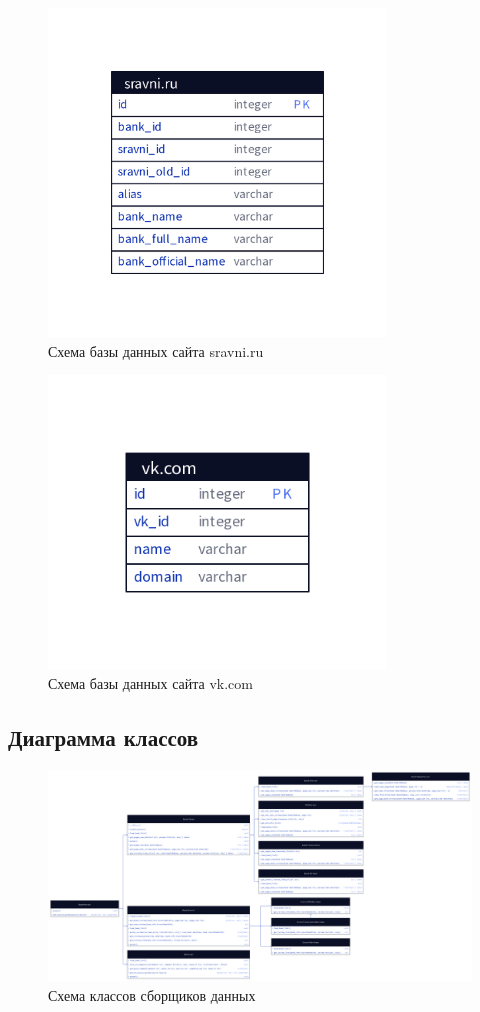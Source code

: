 \documentclass[PI, VKR]{HSEUniversity}
\begin{document}
\begin{figure}[h!]
\centering
\includegraphics[width=0.8\textwidth]{img/d2/sravni_ru.png}
\caption{\label{fig:database_sravni_ru}Схема базы данных сайта sravni.ru}
\end{figure}

\begin{figure}[h!]
\centering
\includegraphics[width=0.8\textwidth]{img/d2/vk_com.png}
\caption{\label{fig:database_vk_com}Схема базы данных сайта vk.com}
\end{figure}

\begin{landscape}
\chapter{Диаграмма классов}
\label{sec:orga137922}
\begin{figure}[h!]
\centering
\includegraphics[width=.9\linewidth]{img/d2/parser_class.png}
\caption{\label{fig:parser_class_diagram}Схема классов сборщиков данных}
\end{figure}
\end{landscape}
\end{document}
